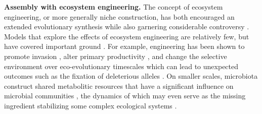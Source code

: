 \documentclass[twocolumn,preprintnumbers,amsmath,amssymb,superscriptaddress,linenumbers]{revtex4-1}
\begin{document}
\vspace{0mm}
\noindent \textbf{Assembly with ecosystem engineering.}
The concept of ecosystem engineering, or more generally niche construction, has both encouraged an extended evolutionary synthesis \cite{Laland2015} while also garnering considerable controversy \cite{Gupta2017,Feldman2017}.
Models that explore the effects of ecosystem engineering are relatively few, but have covered important ground \cite{Hastings2007,OdlingSmee2013}.
For example, engineering has been shown to promote invasion \cite{Cuddington2004}, alter primary productivity \cite{Wright2004}, and change the selective environment over eco-evolutionary timescales \cite{Kylafis2008,Krakauer2009} which can lead to unexpected outcomes such as the fixation of deleterious alleles \cite{Laland1999}.
On smaller scales, microbiota construct shared metabolitic resources that have a significant influence on microbial communities \cite{Kallus2017}, the dynamics of which may even serve as the missing ingredient stabilizing some complex ecological systems \cite{Muscarella2017}.
\end{document}
